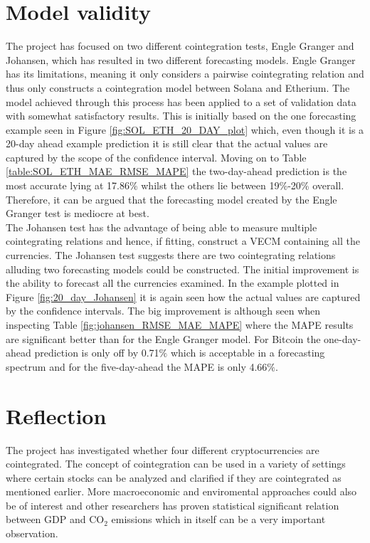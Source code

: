 \section{Model validity}
The project has focused on two different cointegration tests, Engle Granger and Johansen, which has resulted in two different forecasting models. Engle Granger has its limitations, meaning it only considers a pairwise cointegrating relation and thus only constructs a cointegration model between Solana and Etherium. The model achieved through this process has been applied to a set of validation data with somewhat satisfactory results. This is initially based on the one forecasting example seen in Figure \ref{fig:SOL_ETH_20_DAY_plot} which, even though it is a 20-day ahead example prediction it is still clear that the actual values are captured by the scope of the confidence interval. Moving on to Table \ref{table:SOL_ETH_MAE_RMSE_MAPE} the two-day-ahead prediction is the most accurate lying at 17.86\% whilst the others lie between 19\%-20\% overall. Therefore, it can be argued that the forecasting model created by the Engle Granger test is mediocre at best.\\
The Johansen test has the advantage of being able to measure multiple cointegrating relations and hence, if fitting, construct a VECM containing all the currencies. The Johansen test suggests there are two cointegrating relations alluding two forecasting models could be constructed. The initial improvement is the ability to forecast all the currencies examined. In the example plotted in Figure \ref{fig:20_day_Johansen} it is again seen how the actual values are captured by the confidence intervals. The big improvement is although seen when inspecting Table \ref{fig:johansen_RMSE_MAE_MAPE} where the MAPE results are significant better than for the Engle Granger model. For Bitcoin the one-day-ahead prediction is only off by 0.71$\%$ which is acceptable in a forecasting spectrum and for the five-day-ahead the MAPE is only 4.66$\%$.

\section{Reflection}
The project has investigated whether four different cryptocurrencies are cointegrated. The concept of cointegration can be used in a variety of settings where certain stocks can be analyzed and clarified if they are cointegrated as mentioned earlier. More macroeconomic and enviromental approaches could also be of interest and other researchers has proven statistical significant relation between GDP and CO$_2$ emissions \cite{A_Cointegration_Analysis_of_Real_GDP} which in itself can be a very important observation.